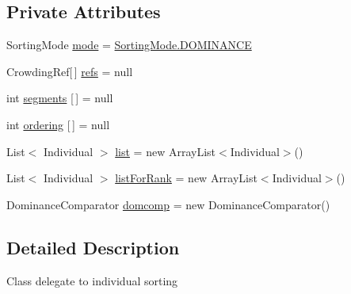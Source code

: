 \subsection*{Private Attributes}
\begin{DoxyCompactItemize}
\item 
Sorting\-Mode \hyperlink{classjenes_1_1population_1_1_fitness_3_01_c_01extends_01_chromosome_01_4_1_1_sorter_a9cd326d1839d016f37b61bdd5b65bdf9}{mode} = \hyperlink{enumjenes_1_1population_1_1_fitness_3_01_c_01extends_01_chromosome_01_4_1_1_sorting_mode_a5f50d22a127c87d3cfd8a47d4d131b83}{Sorting\-Mode.\-D\-O\-M\-I\-N\-A\-N\-C\-E}
\item 
Crowding\-Ref\mbox{[}$\,$\mbox{]} \hyperlink{classjenes_1_1population_1_1_fitness_3_01_c_01extends_01_chromosome_01_4_1_1_sorter_afea619512a6254692e6dfb5fb07e7454}{refs} = null
\item 
int \hyperlink{classjenes_1_1population_1_1_fitness_3_01_c_01extends_01_chromosome_01_4_1_1_sorter_a2e9dd639fc61868ac73a722a1e1d376b}{segments} \mbox{[}$\,$\mbox{]} = null
\item 
int \hyperlink{classjenes_1_1population_1_1_fitness_3_01_c_01extends_01_chromosome_01_4_1_1_sorter_a88514d81f3a4fbccfb5146402265362f}{ordering} \mbox{[}$\,$\mbox{]} = null
\item 
List$<$ Individual $>$ \hyperlink{classjenes_1_1population_1_1_fitness_3_01_c_01extends_01_chromosome_01_4_1_1_sorter_a4dd2dfbe2ebcf33bed654b95507fb239}{list} = new Array\-List$<$Individual$>$()
\item 
List$<$ Individual $>$ \hyperlink{classjenes_1_1population_1_1_fitness_3_01_c_01extends_01_chromosome_01_4_1_1_sorter_a3d040824f7aac6034db6ce86156565a2}{list\-For\-Rank} = new Array\-List$<$Individual$>$()
\item 
Dominance\-Comparator \hyperlink{classjenes_1_1population_1_1_fitness_3_01_c_01extends_01_chromosome_01_4_1_1_sorter_aa1888c6a470ee6e795d9488322e60143}{domcomp} = new Dominance\-Comparator()
\end{DoxyCompactItemize}


\subsection{Detailed Description}
Class delegate to individual sorting 

